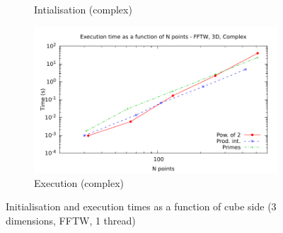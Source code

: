 \documentclass[12pt, a4paper]{article}
\begin{document}
\begin{figure}[H]
\begin{subfigure}{.5\textwidth}
\caption{Intialisation (complex)}
\label{3DFFTWCI}
\end{subfigure}%
\begin{subfigure}{.5\textwidth}
\centering
\includegraphics[width=.9\linewidth]{graphs/3d-fftw-exec-c.pdf}
\caption{Execution (complex)}
\label{3DFFTWC}
\end{subfigure}
\caption{Initialisation and execution times as a function of cube side (3 dimensions, FFTW, 1 thread)}
\label{3DFFTW}
\end{figure}
\end{document}
